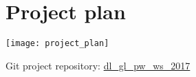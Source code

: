 \documentclass[utf8, english]{lni}
\begin{document}
\section{Project plan}
\begin{minipage}{\textwidth} 
	\centering
	\texttt{[image: project\_plan]}
	\label{pic:newspaperload1}
\end{minipage}
\newline \newline
Git project repository: \href{https://clarin06.ims.uni-stuttgart.de/weisspl/dl_project_gl_pw}{dl\_gl\_pw\_ws\_2017}
\end{document}
